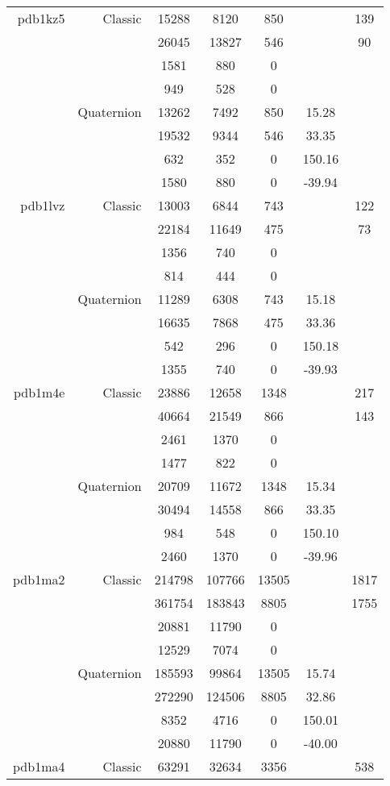 \begin{xltabular}{\textwidth}{r|rcccSc}
pdb1kz5 & Classic & 15288 & 8120 & 850 & & 139 \\
& & 26045 & 13827 & 546 & & 90 \\
& & 1581 & 880 & 0 & & \\
& & 949 & 528 & 0 & & \\
& Quaternion & 13262 & 7492 & 850 & 15.28 & \\
& & 19532 & 9344 & 546 & 33.35 & \\
& & 632 & 352 & 0 & 150.16 & \\
& & 1580 & 880 & 0 & -39.94 & \\ \addlinespace
pdb1lvz & Classic & 13003 & 6844 & 743 & & 122 \\
& & 22184 & 11649 & 475 & & 73 \\
& & 1356 & 740 & 0 & & \\
& & 814 & 444 & 0 & & \\
& Quaternion & 11289 & 6308 & 743 & 15.18 & \\
& & 16635 & 7868 & 475 & 33.36 & \\
& & 542 & 296 & 0 & 150.18 & \\
& & 1355 & 740 & 0 & -39.93 & \\ \addlinespace
pdb1m4e & Classic & 23886 & 12658 & 1348 & & 217 \\
& & 40664 & 21549 & 866 & & 143 \\
& & 2461 & 1370 & 0 & & \\
& & 1477 & 822 & 0 & & \\
& Quaternion & 20709 & 11672 & 1348 & 15.34 & \\
& & 30494 & 14558 & 866 & 33.35 & \\
& & 984 & 548 & 0 & 150.10 & \\
& & 2460 & 1370 & 0 & -39.96 & \\ \addlinespace
pdb1ma2 & Classic & 214798 & 107766 & 13505 & & 1817 \\
& & 361754 & 183843 & 8805 & & 1755 \\
& & 20881 & 11790 & 0 & & \\
& & 12529 & 7074 & 0 & & \\
& Quaternion & 185593 & 99864 & 13505 & 15.74 & \\
& & 272290 & 124506 & 8805 & 32.86 & \\
& & 8352 & 4716 & 0 & 150.01 & \\
& & 20880 & 11790 & 0 & -40.00 & \\ \addlinespace
pdb1ma4 & Classic & 63291 & 32634 & 3356 & & 538 \\

\end{xltabular}
